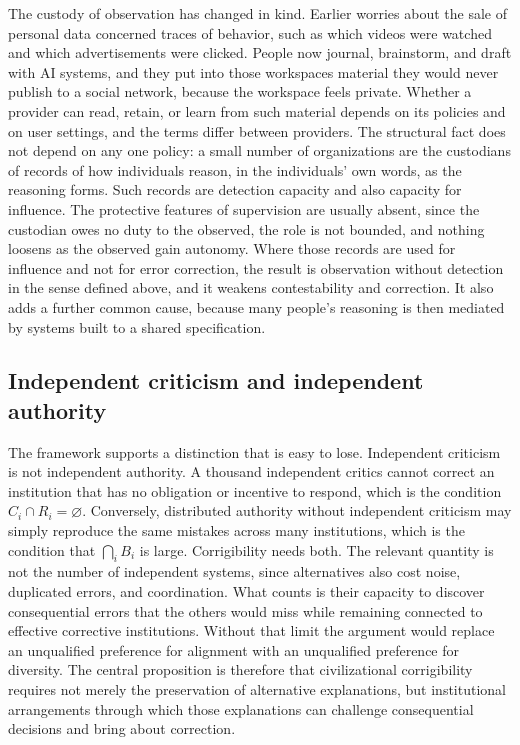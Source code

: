\documentclass[11pt]{article}
\begin{document}
The custody of observation has changed in kind. Earlier worries about the sale of personal data concerned traces of behavior, such as which videos were watched and which advertisements were clicked. People now journal, brainstorm, and draft with AI systems, and they put into those workspaces material they would never publish to a social network, because the workspace feels private. Whether a provider can read, retain, or learn from such material depends on its policies and on user settings, and the terms differ between providers. The structural fact does not depend on any one policy: a small number of organizations are the custodians of records of how individuals reason, in the individuals' own words, as the reasoning forms. Such records are detection capacity and also capacity for influence. The protective features of supervision are usually absent, since the custodian owes no duty to the observed, the role is not bounded, and nothing loosens as the observed gain autonomy. Where those records are used for influence and not for error correction, the result is observation without detection in the sense defined above, and it weakens contestability and correction. It also adds a further common cause, because many people's reasoning is then mediated by systems built to a shared specification.

\subsection{Independent criticism and independent authority}

The framework supports a distinction that is easy to lose. Independent criticism is not independent authority. A thousand independent critics cannot correct an institution that has no obligation or incentive to respond, which is the condition $C_i \cap R_i = \varnothing$. Conversely, distributed authority without independent criticism may simply reproduce the same mistakes across many institutions, which is the condition that $\bigcap_i B_i$ is large. Corrigibility needs both. The relevant quantity is not the number of independent systems, since alternatives also cost noise, duplicated errors, and coordination. What counts is their capacity to discover consequential errors that the others would miss while remaining connected to effective corrective institutions. Without that limit the argument would replace an unqualified preference for alignment with an unqualified preference for diversity. The central proposition is therefore that civilizational corrigibility requires not merely the preservation of alternative explanations, but institutional arrangements through which those explanations can challenge consequential decisions and bring about correction.
\end{document}
